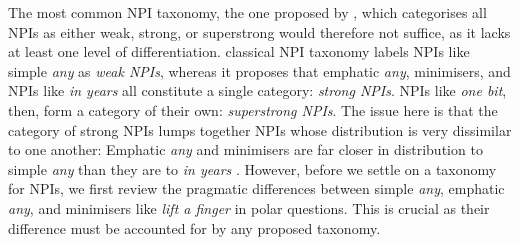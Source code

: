 The most common NPI taxonomy, the one proposed by \textcite{Zwarts1998}, which categorises all NPIs as either weak, strong, or superstrong would therefore not suffice, as it lacks at least one level of differentiation.  classical NPI taxonomy labels NPIs like simple \textit{any} as \textit{weak NPIs}, whereas it proposes that emphatic \textit{any}, minimisers, and NPIs like \textit{in years} all constitute a single category: \textit{strong NPIs}. NPIs like \textit{one bit}, then, form a category of their own: \textit{superstrong NPIs}. The issue here is that the category of strong NPIs lumps together NPIs whose distribution is very dissimilar to one another: Emphatic \textit{any} and minimisers are far closer in distribution to simple \textit{any} than they are to \textit{in years} \parencite[see, amongst others,][]{Heim1984,Lahiri1998,Guerzoni2004,Crnic2011}.
However, before we settle on a taxonomy for NPIs, we first review the pragmatic differences between simple \textit{any}, emphatic \textit{any}, and minimisers like \textit{lift a finger} in polar questions. This is crucial as their difference must be accounted for by any proposed taxonomy.


